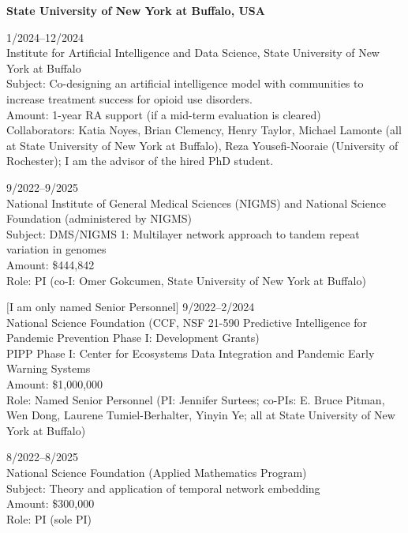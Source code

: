 \documentclass[11pt,letter]{article}
\renewenvironment{itemize}{
  \begin{list}{}{
    \setlength{\leftmargin}{1.5em}
    \setlength{\itemsep}{0.25em}
    \setlength{\parskip}{0pt}
    \setlength{\parsep}{0.25em}
  }
}{
  \end{list}
}
\begin{document}
\begin{itemize}

\item \textbf{State University of New York at Buffalo, USA}

\item 1/2024--12/2024\\
Institute for Artificial Intelligence and Data Science, State University of New York at Buffalo\\
Subject: Co-designing an artificial intelligence model with communities to increase treatment success for opioid use disorders.\\
Amount: 1-year RA support (if a mid-term evaluation is cleared)\\
Collaborators: Katia Noyes, Brian Clemency, Henry Taylor, Michael Lamonte (all at State University of New York at Buffalo), Reza Yousefi-Nooraie (University of Rochester); I am the advisor of the hired PhD student.


\item 9/2022--9/2025\\
National Institute of General Medical Sciences (NIGMS) and National Science Foundation (administered by NIGMS) \\
Subject: DMS/NIGMS 1: Multilayer network approach to tandem repeat variation in genomes\\
Amount: \$444,842\\
Role: PI (co-I: Omer Gokcumen, State University of New York at Buffalo)
%

\item $[$I am only named Senior Personnel$]$ 9/2022--2/2024\\
National Science Foundation (CCF, NSF 21-590 Predictive Intelligence for Pandemic Prevention Phase I: Development Grants)\\
PIPP Phase I: Center for Ecosystems Data Integration and Pandemic Early Warning Systems\\
Amount: \$1,000,000\\
Role: Named Senior Personnel (PI: Jennifer Surtees; co-PIs: E. Bruce Pitman, Wen Dong, Laurene Tumiel-Berhalter, Yinyin Ye; all at State University of New York at Buffalo)
%

\item 8/2022--8/2025\\
National Science Foundation (Applied Mathematics Program)\\
Subject: Theory and application of temporal network embedding\\
Amount: \$300,000\\
Role: PI  (sole PI)
% 


\end{itemize}
\end{document}
